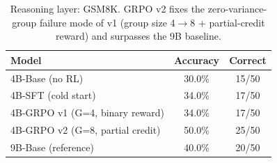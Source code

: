 
\begin{table}[t]
  \centering
  \caption{Reasoning layer: GSM8K. GRPO v2 fixes the zero-variance-group failure mode of v1 (group size 4$\rightarrow$8 + partial-credit reward) and surpasses the 9B baseline.}
  \label{tab:gsm8k}
  \begin{tabular}{lcc}
    \toprule
    Model & Accuracy & Correct \\
    \midrule
    4B-Base (no RL) & 30.0\% & 15/50 \\
    4B-SFT (cold start) & 34.0\% & 17/50 \\
    4B-GRPO v1 (G=4, binary reward) & 34.0\% & 17/50 \\
    4B-GRPO v2 (G=8, partial credit) & 50.0\% & 25/50 \\
    9B-Base (reference) & 40.0\% & 20/50 \\
    \bottomrule
  \end{tabular}
\end{table}
